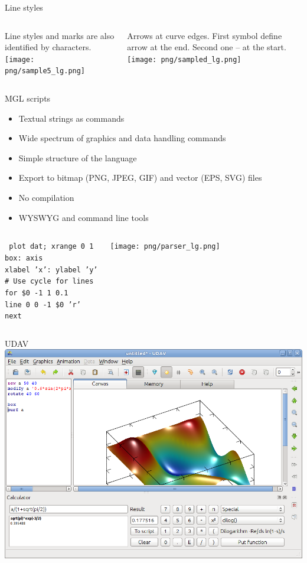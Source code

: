 \documentclass[color=usenames]{beamer}
\begin{document}
\begin{frame}{Line styles}
\begin{columns}
Line styles and marks are also identified by characters.\\
\texttt{[image: png/sample5\_lg.png]}

Arrows at curve edges. First symbol define arrow at the end. Second one -- at the start.\\
\texttt{[image: png/sampled\_lg.png]}
\end{columns}
\end{frame}

\begin{frame}{MGL scripts}
\begin{itemize}
\item Textual strings as commands
\item Wide spectrum of graphics and data handling commands
\item Simple structure of the language
\item Export to bitmap (PNG, JPEG, GIF) and vector (EPS, SVG) files
\item No compilation
\item WYSWYG and command line tools
\end{itemize}

\begin{columns}\small
{}
\texttt{\flushleft
plot dat; xrange 0 1\\
box: axis\\
xlabel 'x': ylabel 'y'\\
\# Use cycle for lines\\
for \$0 -1 1 0.1\\
line 0 0 -1 \$0 'r'\\
next}

\texttt{[image: png/parser\_lg.png]}
\end{columns}
\end{frame}

\begin{frame}{UDAV}
\includegraphics[width = \textwidth]{main.png}
\end{frame}
\end{document}
